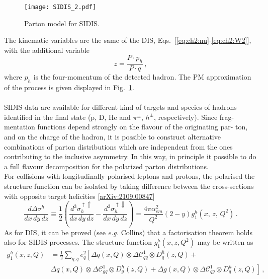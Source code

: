 \begin{figure}
  \centering
  \texttt{[image: SIDIS\_2.pdf]} 
  \caption{Parton model for SIDIS.}
  \label{fig:SIDIS_PM}
\end{figure}
The kinematic variables are the same of the DIS, Eqs.~[\ref{eq:ch2:nu}-\ref{eq:ch2:W2}], with the additional variable
\begin{equation}
  z = \frac{P \cdot p_h}{P \cdot q} \,,
\end{equation}
where $p_h$ is the four-momentum of the detected hadron. The PM approximation of the process is given displayed in Fig.~\ref{fig:SIDIS_PM}.
\\
\\
SIDIS data are available for different kind of targets and species of hadrons identified in the final state (p, D, He and $\pi^{\pm}$, $h^{\pm}$, respectively). Since frag- mentation functions depend strongly on the flavour of the originating par- ton, and on the charge of the hadron, it is possible to construct alternative combinations of parton distributions which are independent from the ones contributing to the inclusive asymmetry. In this way, in principle it possible to do a full flavour decomposition for the polarized parton distributions.
\\
For collisions with longitudinally polarised leptons and protons, the polarised the structure function can be isolated by taking difference between the cross-sections with opposite target helicities [\href{https://arxiv.org/abs/2109.00847v2}{arXiv:2109.00847}] 
\begin{equation}
  \frac{d \Delta \sigma^h}{dx \, dy \, dz} \equiv  \frac{1}{2} \left(\frac{d^3\sigma_{h}^{\uparrow \Uparrow}}{dx\,dy\,dz} - \frac{d^3\sigma_{h}^{\uparrow \Downarrow}}{dx\,dy\,dz}\right) = \frac{4\pi \alpha_{em}^2}{Q^2} (2-y) g_{1}^{h} (x,\,z,\,Q^2)\,.
\end{equation}
As for DIS, it can be proved (see \textit{e.g.} Collins) that a factorisation theorem holds also for SIDIS processes. The structure function $g_1^h (x,z,Q^2)$ may be written as
\begin{equation}
  \begin{split}
    g_1^{h} (x,z,Q) & = \frac{1}{2} \sum_{q,\bar{q}} e_{q}^2 \left[ \Delta q(x,Q) \otimes \Delta \mathcal{C}_{qq}^{1} \otimes D_{q}^{h}(z,Q) + \right.\\
    & \left.\Delta q(x,Q) \otimes \Delta \mathcal{C}_{gq}^{1} \otimes D^{h}_{g}(z,Q) + \Delta g(x,Q) \otimes \Delta \mathcal{C}_{qg}^{1} \otimes D^{h}_{q}(z,Q) \right] \,,
    \end{split}
    \label{eq:g1h}
\end{equation}
